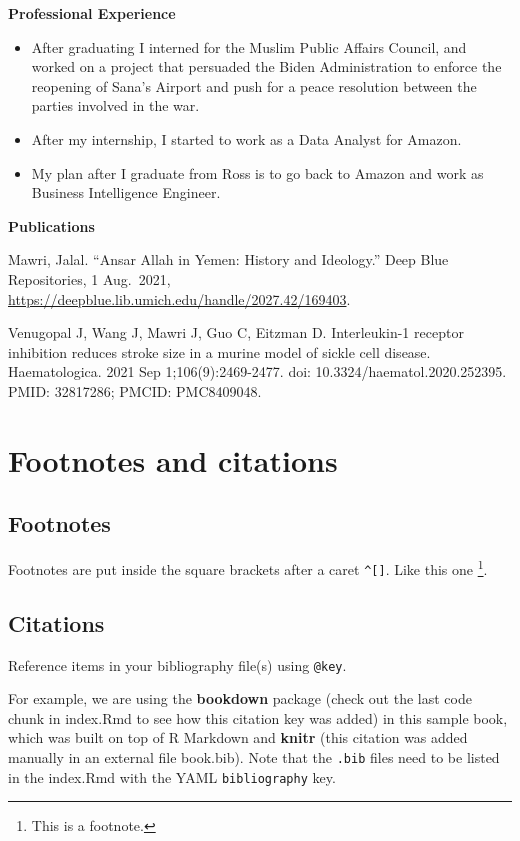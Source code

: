 \documentclass[
]{book}
\providecommand{\tightlist}{%
  \setlength{\itemsep}{0pt}\setlength{\parskip}{0pt}}
\theoremstyle{definition}
\theoremstyle{definition}
\theoremstyle{definition}
\theoremstyle{definition}
\theoremstyle{remark}
\begin{document}
\textbf{Professional Experience}

\begin{itemize}
\tightlist
\item
  After graduating I interned for the Muslim Public Affairs Council, and worked on a project that persuaded the Biden Administration to enforce the reopening of Sana's Airport and push for a peace resolution between the parties involved in the war.
\item
  After my internship, I started to work as a Data Analyst for Amazon.
\item
  My plan after I graduate from Ross is to go back to Amazon and work as Business Intelligence Engineer.
\end{itemize}

\textbf{Publications}

Mawri, Jalal. ``Ansar Allah in Yemen: History and Ideology.'' Deep Blue Repositories, 1 Aug.~2021, \url{https://deepblue.lib.umich.edu/handle/2027.42/169403}.

Venugopal J, Wang J, Mawri J, Guo C, Eitzman D. Interleukin-1 receptor inhibition reduces stroke size in a murine model of sickle cell disease. Haematologica. 2021 Sep 1;106(9):2469-2477. doi: 10.3324/haematol.2020.252395. PMID: 32817286; PMCID: PMC8409048.

\hypertarget{footnotes-and-citations}{%
\chapter{Footnotes and citations}\label{footnotes-and-citations}}

\hypertarget{footnotes}{%
\section{Footnotes}\label{footnotes}}

Footnotes are put inside the square brackets after a caret \texttt{\^{}{[}{]}}. Like this one \footnote{This is a footnote.}.

\hypertarget{citations}{%
\section{Citations}\label{citations}}

Reference items in your bibliography file(s) using \texttt{@key}.

For example, we are using the \textbf{bookdown} package \citep{R-bookdown} (check out the last code chunk in index.Rmd to see how this citation key was added) in this sample book, which was built on top of R Markdown and \textbf{knitr} \citep{xie2015} (this citation was added manually in an external file book.bib).
Note that the \texttt{.bib} files need to be listed in the index.Rmd with the YAML \texttt{bibliography} key.
\end{document}
